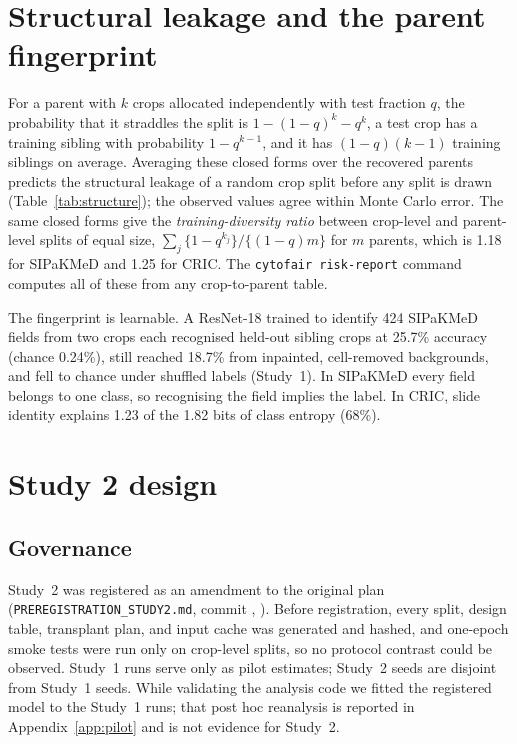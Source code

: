 \documentclass[11pt]{article}
\begin{document}
\section{Structural leakage and the parent fingerprint}
\label{sec:structure}

For a parent with $k$ crops allocated independently with test fraction $q$, the probability
that it straddles the split is $1-(1-q)^k-q^k$, a test crop has a training sibling with
probability $1-q^{k-1}$, and it has $(1-q)(k-1)$ training siblings on average. Averaging
these closed forms over the recovered parents predicts the structural leakage of a
random crop split before any split is drawn (Table~\ref{tab:structure}); the observed
values agree within Monte Carlo error. The same closed forms give the
\emph{training-diversity ratio} between crop-level and parent-level splits of equal size,
$\sum_j\{1-q^{k_j}\}/\{(1-q)m\}$ for $m$ parents, which is 1.18 for SIPaKMeD and 1.25 for
CRIC. The \texttt{cytofair risk-report} command computes all of these from any
crop-to-parent table.



The fingerprint is learnable. A ResNet-18 trained to identify 424 SIPaKMeD fields from
two crops each recognised held-out sibling crops at 25.7\% accuracy (chance 0.24\%), still
reached 18.7\% from inpainted, cell-removed backgrounds, and fell to chance under shuffled
labels (Study~1). In SIPaKMeD every field belongs to one class, so recognising the field
implies the label. In CRIC, slide identity explains 1.23 of the 1.82 bits of class
entropy (68\%).

\section{Study 2 design}
\label{sec:design}

\subsection{Governance}

Study~2 was registered as an amendment to the original plan
(\texttt{PREREGISTRATION\_STUDY2.md}, commit \texttt{\RegistrationCommit},
\RegistrationTime). Before registration, every split, design table, transplant plan, and
input cache was generated and hashed, and one-epoch smoke tests were run only on
crop-level splits, so no protocol contrast could be observed. Study~1 runs serve only as
pilot estimates; Study~2 seeds are disjoint from Study~1 seeds. While validating the
analysis code we fitted the registered model to the Study~1 runs; that post hoc reanalysis
is reported in Appendix~\ref{app:pilot} and is not evidence for Study~2.
\end{document}
